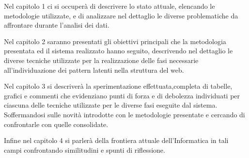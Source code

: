 Nel capitolo 1 ci si occuperà di descrivere lo stato attuale, elencando le metodologie utilizzate, e di analizzare nel dettaglio le diverse problematiche da affrontare durante l'analisi dei dati.

Nel capitolo 2 saranno presentati gli obiettivi principali che la metodologia presentata ed il sistema realizzato hanno seguito, descrivendo nel dettaglio le diverse tecniche utilizzate per la realizzazione delle fasi necessarie all'individuazione dei pattern latenti nella struttura del web.

Nel capitolo 3 si descriverà la sperimentazione effettuata,completa di tabelle, grafici e commenti che evidenziano punti di forza e di debolezza individuati per ciascuna delle tecniche utilizzate per le diverse fasi eseguite dal sistema. Soffermandosi sulle novità introdotte con le metodologie presentate e cercando di confrontarle con quelle consolidate.

Infine nel capitolo 4 si parlerà della frontiera attuale dell'Informatica in tali campi confrontando similitudini e spunti di riflessione.


